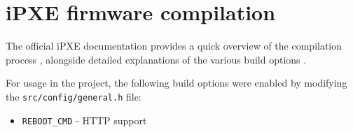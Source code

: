 \documentclass[../main.tex]{subfiles}
\begin{document}
\section{iPXE firmware compilation}

The official iPXE documentation provides a quick overview of the compilation process \cite{ipxe_compilation_guide},
alongside detailed explanations of the various build options \cite{ipxe_build_options}.

For usage in the project, the following build options were enabled by modifying the \texttt{src/config/general.h} file:

\begin{itemize}
  \item \texttt{REBOOT\_CMD} - HTTP support
\end{itemize}
\end{document}
